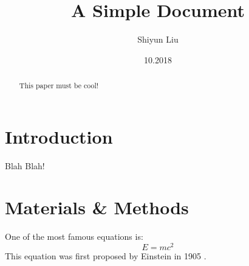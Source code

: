 \documentclass[12pt]{article}
\title{A Simple Document}
\author{Shiyun Liu}}
\date{10.2018}
\begin{document}
  \maketitle
  \begin{abstract}
    This paper must be cool!
  \end{abstract}
  \section{Introduction}
    Blah Blah!
  \section{Materials \& Methods}
  One of the most famous equations is:
  \begin{equation}
    E = mc^2
  \end{equation}
  This equation was first proposed by Einstein in 1905
  \cite{einstein1905does}.
  
  
\end{document}
